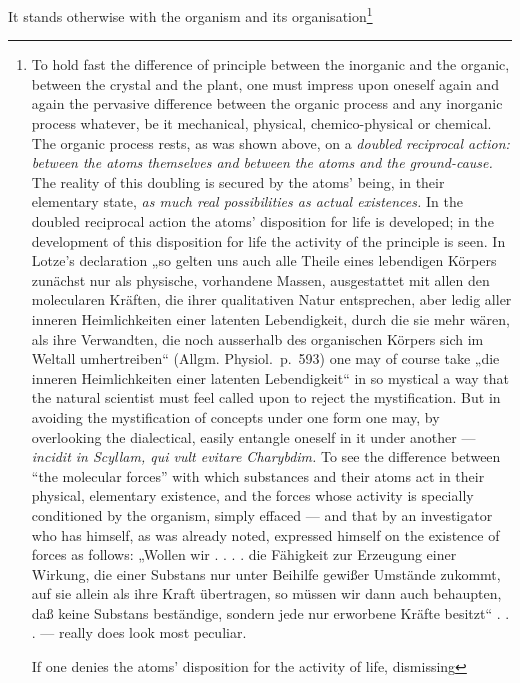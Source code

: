 \documentclass[12pt,a4paper]{book}
\begin{document}
It stands otherwise with the organism and its
organisation\footnote{To hold fast the difference of principle between the
inorganic and the organic, between the crystal and the plant, one must impress
upon oneself again and again the pervasive difference between the organic
process and any inorganic process whatever,
be it mechanical, physical, chemico-physical or chemical. The organic process
rests, as was shown above, on a \emph{doubled reciprocal action: between the
atoms themselves and between the atoms and the ground-cause.} The reality of
this doubling is secured by the atoms' being, in their elementary state,
\emph{as much real possibilities as actual existences.} In the doubled
reciprocal action the atoms' disposition for life is developed; in the
development of this disposition for life the activity of the principle is seen.
In Lotze's declaration „so gelten uns auch alle Theile
eines lebendigen Körpers zunächst nur als physische, vorhandene Massen,
ausgestattet mit allen den molecularen Kräften, die ihrer qualitativen
Natur entsprechen, aber ledig aller inneren Heimlichkeiten einer latenten
Lebendigkeit, durch die sie mehr wären, als ihre Verwandten, die noch
ausserhalb des organischen Körpers sich im Weltall umhertreiben“ (Allgm.
Physiol.\ p.~593) one may of course take „die inneren Heimlichkeiten einer
latenten Lebendigkeit“ in so mystical a way that the natural scientist must
feel called upon to reject the mystification. But in avoiding the
mystification of concepts under one form one may, by overlooking the
dialectical, easily entangle oneself in it under another ---
\textit{incidit in Scyllam, qui vult evitare Charybdim.} To see the difference
between ``the molecular forces'' with which substances and their atoms act in
their physical, elementary existence, and the forces whose activity is
specially conditioned by the organism, simply effaced --- and that by an
investigator who has himself, as was already noted, expressed himself on the
existence of forces as follows: „Wollen wir . . . . die Fähigkeit zur Erzeugung
einer Wirkung, die einer Substans nur unter Beihilfe gewißer Umstände zukommt,
auf sie allein als ihre Kraft übertragen, so müssen wir dann auch
behaupten, daß keine Substans beständige, sondern jede nur erworbene
Kräfte besitzt“ . . . --- really does look most peculiar.
\par If one denies the atoms' disposition for the activity of life, dismissing
}
\end{document}
